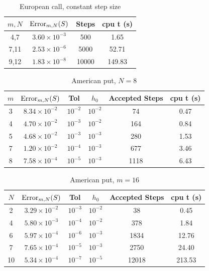 \documentclass[a4paper,12pt]{article}
\begin{document}
 \begin{table}
\begin{center}
 \caption{European call, constant step size}
 \begin{tabular}{||c c c c||} 
 \hline
 $m, N$ & $\operatorname{Error}_{m,N}(S)$ & Steps & cpu t (s) \\ [0.5ex] 
 \hline\hline
 4,7 &  $3.60 \times 10^{-3}$ & 500  & 1.65\\ 
 \hline
 7,11 & $2.53 \times 10^{-6}$ & 5000 & 52.71 \\
 \hline
 9,12 & $1.83 \times 10^{-8}$ & 10000 & 149.83 \\
 \hline
\end{tabular}
\end{center}
\end{table}


 \begin{table}
 \caption{American put, $N = 8$}
\begin{center}
 \begin{tabular}{||c c c c c c ||} 
 \hline
 $m$ & $\operatorname{Error}_{m,N}(S)$  & Tol & $h_0$ & Accepted Steps & cpu t (s) \\ [0.5ex] 
 \hline\hline
 3 & $8.34 \times 10^{-2}$  & $10^{-2}$ & $10^{-2}$ & 74 & 0.47\\ 
 \hline
 4 & $4.70 \times 10^{-2}$  & $10^{-3}$ & $10^{-2}$ & 164 & 0.84 \\
 \hline
 5 & $4.68 \times 10^{-2}$  & $10^{-3}$ & $10^{-3}$ & 280 & 1.53 \\
 \hline
 7 & $1.20 \times 10^{-2}$  & $10^{-4}$ & $10^{-3}$ & 677 & 3.46 \\
 \hline
 8 & $7.58 \times 10^{-4}$  & $10^{-5}$ & $10^{-3}$ & 1118 & 6.43 \\
 \hline
\end{tabular}
\end{center}
\end{table}


 \begin{table}
 \caption{American put, $m = 16$}
\begin{center}
 \begin{tabular}{||c c c c c c||} 
 \hline
 $N$ & $\operatorname{Error}_{m,N}(S)$  & Tol & $h_0$ & Accepted Steps & cpu t (s) \\ [0.5ex] 
 \hline\hline
 2 & $3.29 \times 10^{-2}$  & $10^{-3}$ & $10^{-2}$ & 38 & 0.45\\ 
 \hline
 4 & $5.80 \times 10^{-3}$  & $10^{-4}$ & $10^{-2}$ & 378 & 1.84 \\
 \hline
 6 & $5.97 \times 10^{-4}$  & $10^{-6}$ & $10^{-3}$ & 1834 & 12.76\\
 \hline
 7 & $7.65 \times 10^{-4}$  & $10^{-5}$ & $10^{-3}$ & 2750 & 24.40\\
 \hline
 10 & $5.34 \times 10^{-4}$  & $10^{-7}$ & $10^{-5}$ & 12018 & 213.53 \\
 \hline
\end{tabular}
\end{center}
\end{table}
\end{document}
